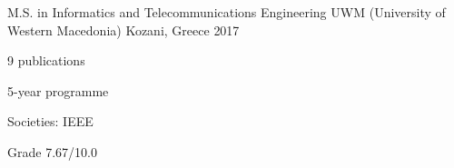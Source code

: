 


\begin{cventries}


\cventry
{M.S. in Informatics and Telecommunications Engineering} %
{UWM (University of Western Macedonia)} %
{Kozani, Greece} %
{2017} %
{ %
\begin{cvitems}
\item {9 publications}
\item {5-year programme}
\item{Societies: IEEE}
\item {Grade 7.67/10.0}
\end{cvitems}
}


\end{cventries}
